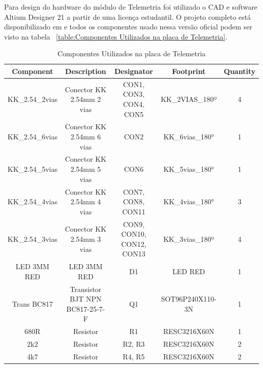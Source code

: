 \documentclass[../delivery_hospital_report.tex]{subfiles}
\begin{document}
Para design do hardware do módulo de Telemetria foi utilizado o CAD e software Altium Designer 21 \cite{altium21} a partir de uma licença estudantil. O projeto completo está disponibilizado em \cite{github_modulos} e todos os componentes usado nessa versão oficial podem ser visto na tabela ~\ref{table:Componentes Utilizados na placa de Telemetria}.

\begin{table}[!h]
\caption{Componentes Utilizados na placa de Telemetria}
\centering
\begin{adjustbox}{width=\columnwidth,center}
\begin{tabular}{|c|c|c|c|c|}

\hline
Component        & Description                                    & Designator                  & Footprint           & Quantity \\ \hline
KK\_2.54\_2vias  & Conector KK 2.54mm 2   vias                    & CON1, CON3, CON4,   CON5    & KK\_2VIAS\_180º     & 4        \\ \hline
KK\_2.54\_6vias  & Conector KK 2.54mm 6   vias                    & CON2                        & KK\_6vias\_180°     & 1        \\ \hline
KK\_2.54\_5vias  & Conector KK 2.54mm 5   vias                    & CON6                        & KK\_5vias\_180°     & 1        \\ \hline
KK\_2.54\_4vias  & Conector KK 2.54mm 4   vias                    & CON7, CON8, CON11           & KK\_4vias\_180°     & 3        \\ \hline
KK\_2.54\_3vias  & Conector KK 2.54mm 3   vias                    & CON9, CON10, CON12,   CON13 & KK\_3vias\_180º     & 4        \\ \hline
LED 3MM RED      & LED 3MM RED                                    & D1                          & LED RED             & 1        \\ \hline
Trans BC817      & Transistor BJT NPN   BC817-25-7-F              & Q1                          & SOT96P240X110-3N    & 1        \\ \hline
680R             & Resistor                                       & R1                          & RESC3216X60N        & 1        \\ \hline
2k2              & Resistor                                       & R2, R3                      & RESC3216X60N        & 2        \\ \hline
4k7              & Resistor                                       & R4, R5                      & RESC3216X60N        & 2        \\ \hline

\end{tabular}
\end{adjustbox}
\end{table}
\end{document}
